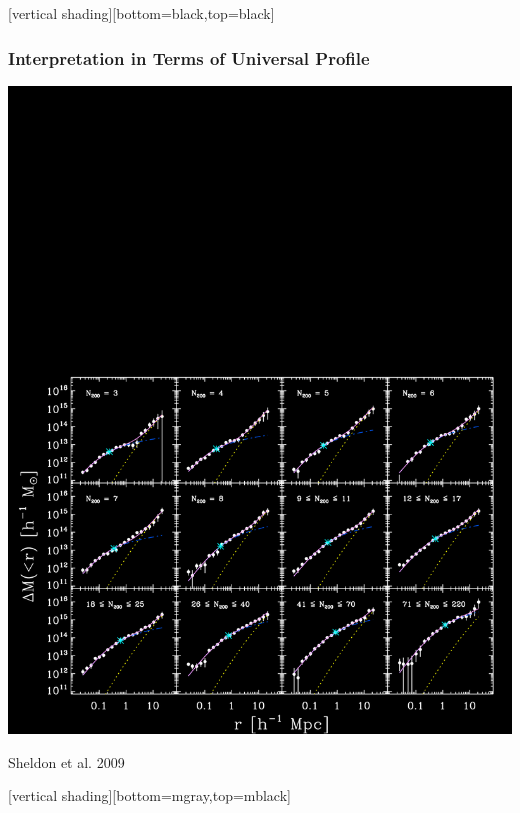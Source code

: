\documentclass{beamer}
\begin{document}
{
    [vertical shading][bottom=black,top=black]


    \frame
    {
        \frametitle{Interpretation in Terms of Universal Profile}

        \begin{center}
            \includegraphics[trim=100 50 850 1390,clip,width=1\textwidth]{m2l-ngals200_12-m21-22-l4-massfits-icolor.png}
        \end{center}
        \hfill {\color{gold} Sheldon et al. 2009}
    }

    [vertical shading][bottom=mgray,top=mblack]
}
\end{document}
